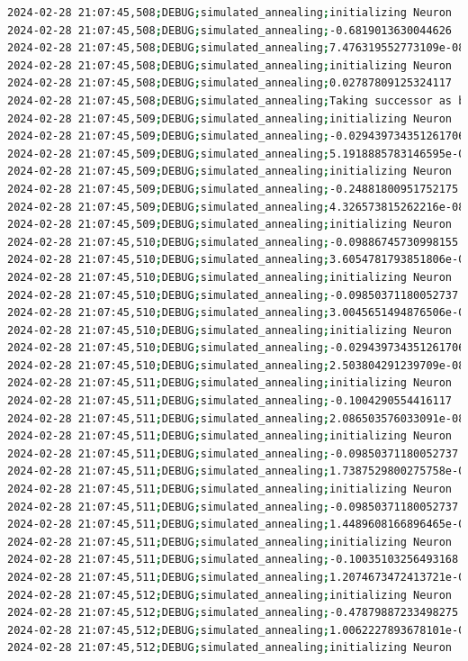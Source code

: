 \documentclass{article}
\begin{document}
\begin{lstlisting}[language=bash, caption=Example Output of Program]
2024-02-28 21:07:45,508;DEBUG;simulated_annealing;initializing Neuron
2024-02-28 21:07:45,508;DEBUG;simulated_annealing;-0.6819013630044626
2024-02-28 21:07:45,508;DEBUG;simulated_annealing;7.476319552773109e-08
2024-02-28 21:07:45,508;DEBUG;simulated_annealing;initializing Neuron
2024-02-28 21:07:45,508;DEBUG;simulated_annealing;0.02787809125324117
2024-02-28 21:07:45,508;DEBUG;simulated_annealing;Taking successor as better option (exploitation)
2024-02-28 21:07:45,509;DEBUG;simulated_annealing;initializing Neuron
2024-02-28 21:07:45,509;DEBUG;simulated_annealing;-0.029439734351261706
2024-02-28 21:07:45,509;DEBUG;simulated_annealing;5.1918885783146595e-08
2024-02-28 21:07:45,509;DEBUG;simulated_annealing;initializing Neuron
2024-02-28 21:07:45,509;DEBUG;simulated_annealing;-0.24881800951752175
2024-02-28 21:07:45,509;DEBUG;simulated_annealing;4.326573815262216e-08
2024-02-28 21:07:45,509;DEBUG;simulated_annealing;initializing Neuron
2024-02-28 21:07:45,510;DEBUG;simulated_annealing;-0.09886745730998155
2024-02-28 21:07:45,510;DEBUG;simulated_annealing;3.6054781793851806e-08
2024-02-28 21:07:45,510;DEBUG;simulated_annealing;initializing Neuron
2024-02-28 21:07:45,510;DEBUG;simulated_annealing;-0.09850371180052737
2024-02-28 21:07:45,510;DEBUG;simulated_annealing;3.0045651494876506e-08
2024-02-28 21:07:45,510;DEBUG;simulated_annealing;initializing Neuron
2024-02-28 21:07:45,510;DEBUG;simulated_annealing;-0.029439734351261706
2024-02-28 21:07:45,510;DEBUG;simulated_annealing;2.503804291239709e-08
2024-02-28 21:07:45,511;DEBUG;simulated_annealing;initializing Neuron
2024-02-28 21:07:45,511;DEBUG;simulated_annealing;-0.1004290554416117
2024-02-28 21:07:45,511;DEBUG;simulated_annealing;2.086503576033091e-08
2024-02-28 21:07:45,511;DEBUG;simulated_annealing;initializing Neuron
2024-02-28 21:07:45,511;DEBUG;simulated_annealing;-0.09850371180052737
2024-02-28 21:07:45,511;DEBUG;simulated_annealing;1.7387529800275758e-08
2024-02-28 21:07:45,511;DEBUG;simulated_annealing;initializing Neuron
2024-02-28 21:07:45,511;DEBUG;simulated_annealing;-0.09850371180052737
2024-02-28 21:07:45,511;DEBUG;simulated_annealing;1.4489608166896465e-08
2024-02-28 21:07:45,511;DEBUG;simulated_annealing;initializing Neuron
2024-02-28 21:07:45,511;DEBUG;simulated_annealing;-0.10035103256493168
2024-02-28 21:07:45,511;DEBUG;simulated_annealing;1.2074673472413721e-08
2024-02-28 21:07:45,512;DEBUG;simulated_annealing;initializing Neuron
2024-02-28 21:07:45,512;DEBUG;simulated_annealing;-0.47879887233498275
2024-02-28 21:07:45,512;DEBUG;simulated_annealing;1.0062227893678101e-08
2024-02-28 21:07:45,512;DEBUG;simulated_annealing;initializing Neuron

\end{lstlisting}
\end{document}
